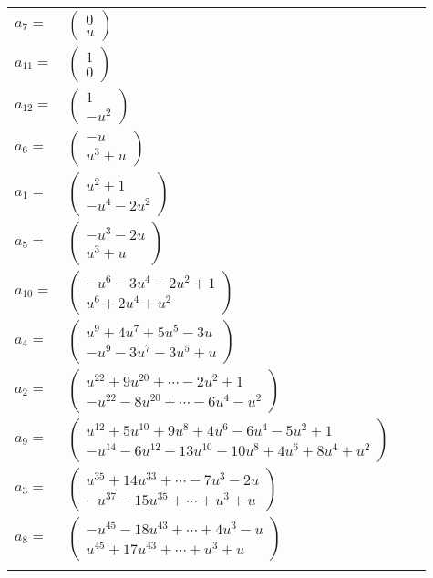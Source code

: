 \documentclass[1p]{elsarticle_modified}
\theoremstyle{definition}
\begin{document}
\begin{tabular}{m{7pt} m{180pt} m{7pt} m{180pt} }
\flushright $a_{7}=$&$\begin{pmatrix}0\\u\end{pmatrix}$ \\
\flushright $a_{11}=$&$\begin{pmatrix}1\\0\end{pmatrix}$ \\
\flushright $a_{12}=$&$\begin{pmatrix}1\\- u^2\end{pmatrix}$ \\
\flushright $a_{6}=$&$\begin{pmatrix}- u\\u^3+u\end{pmatrix}$ \\
\flushright $a_{1}=$&$\begin{pmatrix}u^2+1\\- u^4-2 u^2\end{pmatrix}$ \\
\flushright $a_{5}=$&$\begin{pmatrix}- u^3-2 u\\u^3+u\end{pmatrix}$ \\
\flushright $a_{10}=$&$\begin{pmatrix}- u^6-3 u^4-2 u^2+1\\u^6+2 u^4+u^2\end{pmatrix}$ \\
\flushright $a_{4}=$&$\begin{pmatrix}u^9+4 u^7+5 u^5-3 u\\- u^9-3 u^7-3 u^5+u\end{pmatrix}$ \\
\flushright $a_{2}=$&$\begin{pmatrix}u^{22}+9 u^{20}+\cdots-2 u^2+1\\- u^{22}-8 u^{20}+\cdots-6 u^4- u^2\end{pmatrix}$ \\
\flushright $a_{9}=$&$\begin{pmatrix}u^{12}+5 u^{10}+9 u^8+4 u^6-6 u^4-5 u^2+1\\- u^{14}-6 u^{12}-13 u^{10}-10 u^8+4 u^6+8 u^4+u^2\end{pmatrix}$ \\
\flushright $a_{3}=$&$\begin{pmatrix}u^{35}+14 u^{33}+\cdots-7 u^3-2 u\\- u^{37}-15 u^{35}+\cdots+u^3+u\end{pmatrix}$ \\
\flushright $a_{8}=$&$\begin{pmatrix}- u^{45}-18 u^{43}+\cdots+4 u^3- u\\u^{45}+17 u^{43}+\cdots+u^3+u\end{pmatrix}$\\&\end{tabular}
\end{document}
